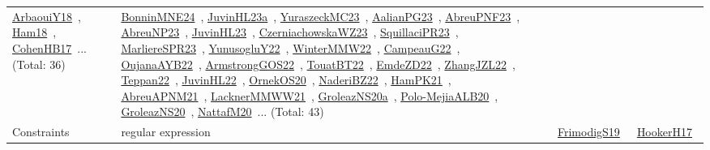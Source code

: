 {\begin{longtable}{lp{3cm}>{\raggedright\arraybackslash}p{6cm}>{\raggedright\arraybackslash}p{6cm}>{\raggedright\arraybackslash}p{8cm}}
\href{../works/ArbaouiY18.pdf}{ArbaouiY18}~\cite{ArbaouiY18}, \href{../works/Ham18.pdf}{Ham18}~\cite{Ham18}, \href{../works/CohenHB17.pdf}{CohenHB17}~\cite{CohenHB17}... (Total: 36) & \href{../works/BonninMNE24.pdf}{BonninMNE24}~\cite{BonninMNE24}, \href{../works/JuvinHL23a.pdf}{JuvinHL23a}~\cite{JuvinHL23a}, \href{../works/YuraszeckMC23.pdf}{YuraszeckMC23}~\cite{YuraszeckMC23}, \href{../works/AalianPG23.pdf}{AalianPG23}~\cite{AalianPG23}, \href{../works/AbreuPNF23.pdf}{AbreuPNF23}~\cite{AbreuPNF23}, \href{../works/AbreuNP23.pdf}{AbreuNP23}~\cite{AbreuNP23}, \href{../works/JuvinHL23.pdf}{JuvinHL23}~\cite{JuvinHL23}, \href{../works/CzerniachowskaWZ23.pdf}{CzerniachowskaWZ23}~\cite{CzerniachowskaWZ23}, \href{../works/SquillaciPR23.pdf}{SquillaciPR23}~\cite{SquillaciPR23}, \href{../works/MarliereSPR23.pdf}{MarliereSPR23}~\cite{MarliereSPR23}, \href{../works/YunusogluY22.pdf}{YunusogluY22}~\cite{YunusogluY22}, \href{../works/WinterMMW22.pdf}{WinterMMW22}~\cite{WinterMMW22}, \href{../works/CampeauG22.pdf}{CampeauG22}~\cite{CampeauG22}, \href{../works/OujanaAYB22.pdf}{OujanaAYB22}~\cite{OujanaAYB22}, \href{../works/ArmstrongGOS22.pdf}{ArmstrongGOS22}~\cite{ArmstrongGOS22}, \href{../works/TouatBT22.pdf}{TouatBT22}~\cite{TouatBT22}, \href{../works/EmdeZD22.pdf}{EmdeZD22}~\cite{EmdeZD22}, \href{../works/ZhangJZL22.pdf}{ZhangJZL22}~\cite{ZhangJZL22}, \href{../works/Teppan22.pdf}{Teppan22}~\cite{Teppan22}, \href{../works/JuvinHL22.pdf}{JuvinHL22}~\cite{JuvinHL22}, \href{../works/OrnekOS20.pdf}{OrnekOS20}~\cite{OrnekOS20}, \href{../works/NaderiBZ22.pdf}{NaderiBZ22}~\cite{NaderiBZ22}, \href{../works/HamPK21.pdf}{HamPK21}~\cite{HamPK21}, \href{../works/AbreuAPNM21.pdf}{AbreuAPNM21}~\cite{AbreuAPNM21}, \href{../works/LacknerMMWW21.pdf}{LacknerMMWW21}~\cite{LacknerMMWW21}, \href{../works/GroleazNS20a.pdf}{GroleazNS20a}~\cite{GroleazNS20a}, \href{../works/Polo-MejiaALB20.pdf}{Polo-MejiaALB20}~\cite{Polo-MejiaALB20}, \href{../works/GroleazNS20.pdf}{GroleazNS20}~\cite{GroleazNS20}, \href{../works/NattafM20.pdf}{NattafM20}~\cite{NattafM20}... (Total: 43)\\
Constraints & regular expression &  & \href{../works/FrimodigS19.pdf}{FrimodigS19}~\cite{FrimodigS19} & \href{../works/HookerH17.pdf}{HookerH17}~\cite{HookerH17}\\

\end{longtable}}
